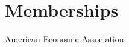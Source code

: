 \documentclass[11pt,letterpaper]{report}
\newcommand{\listitemspace}{0.25em}
\renewenvironment{itemize}
{\begin{list}{}{\setlength{\leftmargin}{0em}
                \setlength{\parskip}{0em}
                \setlength{\itemsep}{\listitemspace}
                \setlength{\parsep}{\listitemspace}}}
{\end{list}}
\begin{document}

    \section*{Memberships}

    \begin{itemize}

        \item American Economic Association

    \end{itemize}










\end{document}
